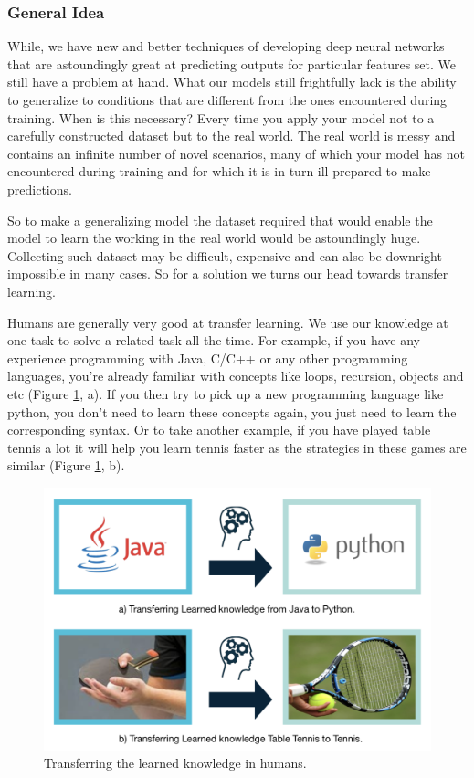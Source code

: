 \documentclass[a4paper, 12pt]{article}
\begin{document}
\begin{sloppypar}
\subsubsection{General Idea}
While, we have new and better techniques of developing deep neural networks that are astoundingly great at predicting outputs for particular features set. We still have a problem at hand. What our models still frightfully lack is the ability to generalize to conditions that are different from the ones encountered during training. When is this necessary? Every time you apply your model not to a carefully constructed dataset but to the real world. The real world is messy and contains an infinite number of novel scenarios, many of which your model has not encountered during training and for which it is in turn ill-prepared to make predictions.\cite{noauthor_transfer_2017}

So to make a generalizing model the dataset required that would enable the model to learn the working in the real world would be astoundingly huge. Collecting such dataset may be difficult, expensive and can also be downright impossible in many cases. So for a solution we turns our head towards transfer learning.

Humans are generally very good at transfer learning. We use our knowledge at one task to solve a related task all the time. For example, if you have any experience programming with Java, C/C++ or any other programming languages, you’re already familiar with concepts like loops, recursion, objects and etc (Figure \ref{human}, a). If you then try to pick up a new programming language like python, you don't need to learn these concepts again, you just need to learn the corresponding syntax. Or to take another example, if you have played table tennis a lot it will help you learn tennis faster as the strategies in these games are similar (Figure \ref{human}, b).\cite{asgarian_transfer_2019}

\begin{figure}[H]
\begin{center}
\includegraphics[scale=0.25]{human_lt.png}
\caption{Transferring the learned knowledge in humans.\cite{asgarian_transfer_2019}\label{human}}
\end{center}
\end{figure}


\end{sloppypar}
\end{document}

